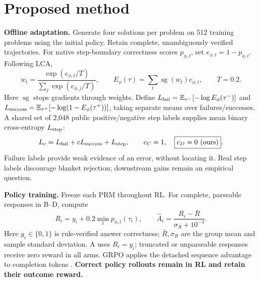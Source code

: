 \documentclass{article}
\newcommand{\E}{\mathbb{E}}
\newcommand{\sg}{\operatorname{sg}}
\begin{document}
\section{Proposed method}
\textbf{Offline adaptation.} Generate four solutions per problem on 512 training problems using the initial policy. Retain complete, unambiguously verified trajectories. For native step-boundary correctness scores $p_{\phi,t}$, set $e_{\phi,t}=1-p_{\phi,t}$. Following LCA,
\begin{equation}
 w_t=\frac{\exp(e_{\phi,t}/T)}{\sum_j\exp(e_{\phi,j}/T)},\qquad
 E_\phi(\tau)=\sum_t\sg(w_t)e_{\phi,t},\qquad T=0.2 .
\end{equation}
Here $\sg$ stops gradients through weights. Define $L_{\rm fail}=\E_{\tau^-}[-\log E_\phi(\tau^-)]$ and $L_{\rm success}=\E_{\tau^+}[-\log(1-E_\phi(\tau^+))]$, taking separate means over failures/successes. A shared set of 2,048 public positive/negative step labels supplies mean binary cross-entropy $L_{\rm step}$:
\begin{equation}
 L_c=L_{\rm fail}+cL_{\rm success}+L_{\rm step},\qquad
 c_C=1,\quad \boxed{c_D=0\ \text{(ours)}} .
\end{equation}
Failure labels provide weak evidence of an error, without locating it. Real step labels discourage blanket rejection; downstream gains remain an empirical question.

\newpage
\noindent\textbf{Policy training.} Freeze each PRM throughout RL. For complete, parseable responses in B--D, compute
\begin{equation}
 R_i=y_i+0.2\min_t p_{\phi,t}(\tau_i),\qquad
 \hat A_i=\frac{R_i-\bar R}{\sigma_R+10^{-4}} .
\end{equation}
Here $y_i\in\{0,1\}$ is rule-verified answer correctness; $\bar R,\sigma_R$ are the group mean and sample standard deviation. A uses $R_i=y_i$; truncated or unparseable responses receive zero reward in all arms. GRPO applies the detached sequence advantage to completion tokens \citep{shao2024}. \textbf{Correct policy rollouts remain in RL and retain their outcome reward.}
\end{document}
